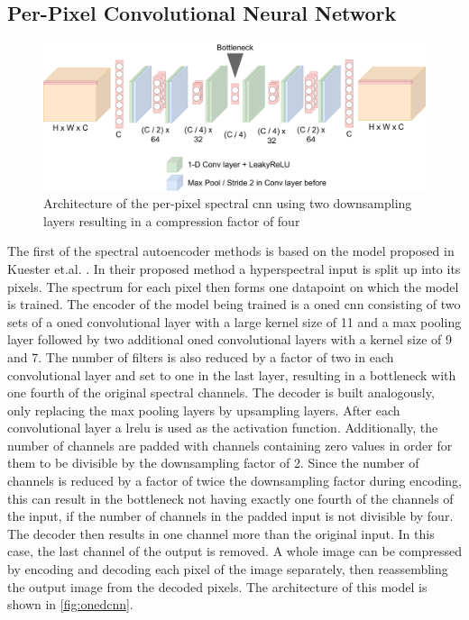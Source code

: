 \subsection{Per-Pixel Convolutional Neural Network\label{sec:conv1d}}
\begin{figure}
\centering
\includegraphics[scale=0.18]{img/OneDCNN.pdf}
\caption[Per-Pixel spectral \ac{cnn}]{Architecture of the per-pixel spectral \ac{cnn} using two downsampling layers resulting in a compression factor of four}
\label{fig:onedcnn}
\end{figure}
The first of the spectral autoencoder methods is based on the model proposed in Kuester et.al. \citep{kuester_1d-convolutional_2021,kuester_transferability_2022}. In their proposed method a hyperspectral input is split up into its pixels. The spectrum for each pixel then forms one datapoint on which the model is trained. The encoder of the model being trained is a \ac{oned} \ac{cnn} consisting of two sets of a \ac{oned} convolutional layer with a large kernel size of 11 and a max pooling layer followed by two additional \ac{oned} convolutional layers with a kernel size of 9 and 7. The number of filters is also reduced by a factor of two in each convolutional layer and set to one in the last layer, resulting in a bottleneck with one fourth of the original spectral channels. The decoder is built analogously, only replacing the max pooling layers by upsampling layers. After each convolutional layer a \ac{lrelu} is used as the activation function. Additionally, the number of channels are padded with channels containing zero values in order for them to be divisible by the downsampling factor of 2. Since the number of channels is reduced by a factor of twice the downsampling factor during encoding, this can result in the bottleneck not having exactly one fourth of the channels of the input, if the number of channels in the padded input is not divisible by four. The decoder then results in one channel more than the original input. In this case, the last channel of the output is removed. A whole image can be compressed by encoding and decoding each pixel of the image separately, then reassembling the output image from the decoded pixels. The architecture of this model is shown in \autoref{fig:onedcnn}.

